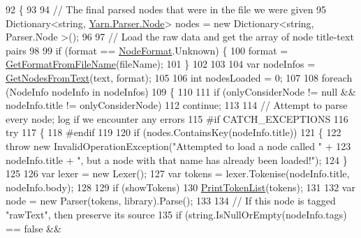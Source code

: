 \begin{DoxyCode}
92         \{
93 
94             \textcolor{comment}{// The final parsed nodes that were in the file we were given}
95             Dictionary<string, \hyperlink{a00112}{Yarn.Parser.Node}> nodes = \textcolor{keyword}{new} Dictionary<string, Parser.Node
      >();
96 
97             \textcolor{comment}{// Load the raw data and get the array of node title-text pairs}
98 
99             \textcolor{keywordflow}{if} (format == \hyperlink{a00031_ad7ebb46e7309ead8767383a672b3272f}{NodeFormat}.Unknown) \{
100                 format = \hyperlink{a00107_a080b2d6b7553c178007c04297d50e9da}{GetFormatFromFileName}(fileName);
101             \}
102 
103 
104             var nodeInfos = \hyperlink{a00107_a0aa76ba9366b44bf78198a78ea958c9c}{GetNodesFromText}(text, format);
105 
106             \textcolor{keywordtype}{int} nodesLoaded = 0;
107 
108             \textcolor{keywordflow}{foreach} (NodeInfo nodeInfo \textcolor{keywordflow}{in} nodeInfos)
109             \{
110 
111                 \textcolor{keywordflow}{if} (onlyConsiderNode != null && nodeInfo.title != onlyConsiderNode)
112                     \textcolor{keywordflow}{continue};
113 
114                 \textcolor{comment}{// Attempt to parse every node; log if we encounter any errors}
115 \textcolor{preprocessor}{#if CATCH\_EXCEPTIONS}
116 \textcolor{preprocessor}{}                \textcolor{keywordflow}{try}
117                 \{
118 \textcolor{preprocessor}{#endif}
119 \textcolor{preprocessor}{}
120                     \textcolor{keywordflow}{if} (nodes.ContainsKey(nodeInfo.title))
121                     \{
122                         \textcolor{keywordflow}{throw} \textcolor{keyword}{new} InvalidOperationException(\textcolor{stringliteral}{"Attempted to load a node called "} +
123                             nodeInfo.title + \textcolor{stringliteral}{", but a node with that name has already been loaded!"});
124                     \}
125 
126                     var lexer = \textcolor{keyword}{new} Lexer();
127                     var tokens = lexer.Tokenise(nodeInfo.title, nodeInfo.body);
128 
129                     \textcolor{keywordflow}{if} (showTokens)
130                         \hyperlink{a00107_a9321fce224021841ce6f70ca7fbe531b}{PrintTokenList}(tokens);
131 
132                     var node = \textcolor{keyword}{new} Parser(tokens, library).Parse();
133 
134                     \textcolor{comment}{// If this node is tagged "rawText", then preserve its source}
135                     \textcolor{keywordflow}{if} (\textcolor{keywordtype}{string}.IsNullOrEmpty(nodeInfo.tags) == \textcolor{keyword}{false} &&

\end{DoxyCode}
